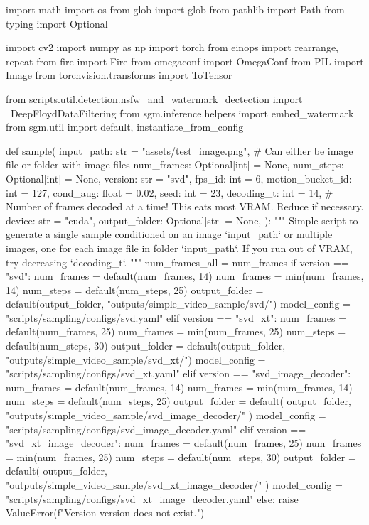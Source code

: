 import math
import os
from glob import glob
from pathlib import Path
from typing import Optional

import cv2
import numpy as np
import torch
from einops import rearrange, repeat
from fire import Fire
from omegaconf import OmegaConf
from PIL import Image
from torchvision.transforms import ToTensor

from scripts.util.detection.nsfw_and_watermark_dectection import \
    DeepFloydDataFiltering
from sgm.inference.helpers import embed_watermark
from sgm.util import default, instantiate_from_config


def sample(
    input_path: str = "assets/test_image.png",  # Can either be image file or folder with image files
    num_frames: Optional[int] = None,
    num_steps: Optional[int] = None,
    version: str = "svd",
    fps_id: int = 6,
    motion_bucket_id: int = 127,
    cond_aug: float = 0.02,
    seed: int = 23,
    decoding_t: int = 14,  # Number of frames decoded at a time! This eats most VRAM. Reduce if necessary.
    device: str = "cuda",
    output_folder: Optional[str] = None,
):
    """
    Simple script to generate a single sample conditioned on an image `input_path` or multiple images, one for each
    image file in folder `input_path`. If you run out of VRAM, try decreasing `decoding_t`.
    """
    num_frames_all = num_frames
    if version == "svd":
        num_frames = default(num_frames, 14)
        num_frames = min(num_frames, 14)
        num_steps = default(num_steps, 25)
        output_folder = default(output_folder, "outputs/simple_video_sample/svd/")
        model_config = "scripts/sampling/configs/svd.yaml"
    elif version == "svd_xt":
        num_frames = default(num_frames, 25)
        num_frames = min(num_frames, 25)
        num_steps = default(num_steps, 30)
        output_folder = default(output_folder, "outputs/simple_video_sample/svd_xt/")
        model_config = "scripts/sampling/configs/svd_xt.yaml"
    elif version == "svd_image_decoder":
        num_frames = default(num_frames, 14)
        num_frames = min(num_frames, 14)
        num_steps = default(num_steps, 25)
        output_folder = default(
            output_folder, "outputs/simple_video_sample/svd_image_decoder/"
        )
        model_config = "scripts/sampling/configs/svd_image_decoder.yaml"
    elif version == "svd_xt_image_decoder":
        num_frames = default(num_frames, 25)
        num_frames = min(num_frames, 25)
        num_steps = default(num_steps, 30)
        output_folder = default(
            output_folder, "outputs/simple_video_sample/svd_xt_image_decoder/"
        )
        model_config = "scripts/sampling/configs/svd_xt_image_decoder.yaml"
    else:
        raise ValueError(f"Version {version} does not exist.")

